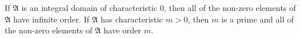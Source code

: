 If $\mathfrak{A}$ is an integral domain of characteristic $0$, then all of the non-zero elements of $\mathfrak{A}$ have infinite order. If $\mathfrak{A}$ has characteristic $m > 0$, then $m$ is a prime and all of the non-zero elements of $\mathfrak{A}$ have order $m$.